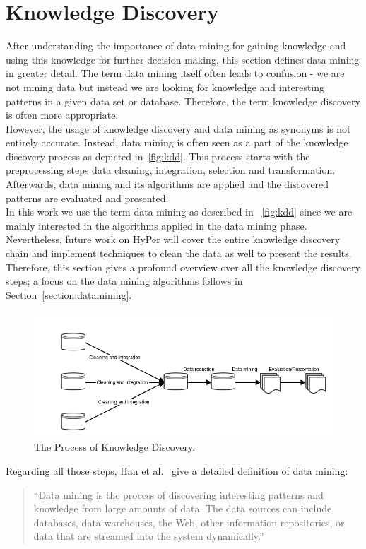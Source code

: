\section{Knowledge Discovery}

After understanding the importance of data mining for gaining knowledge and using this knowledge for further decision making, this section defines data mining in greater detail. The term data mining itself often leads to confusion - we are not mining data but instead we are looking for knowledge and interesting patterns in a given data set or database. Therefore, the term knowledge discovery is often more appropriate.
\\
However, the usage of knowledge discovery and data mining as synonyms is not entirely accurate. Instead, data mining is often seen as a part of the knowledge discovery process as depicted in~\autoref{fig:kdd}. This process starts with the preprocessing steps data cleaning, integration, selection and transformation. Afterwards, data mining and its algorithms are applied and the discovered patterns are evaluated and presented. 
\\
In this work we use the term data mining as described in ~\autoref{fig:kdd} since we are mainly interested in the algorithms applied in the data mining phase. Nevertheless, future work on HyPer will cover the entire knowledge discovery chain and implement techniques to clean the data as well to present the results. Therefore, this section gives a profound overview over all the knowledge discovery steps; a focus on the data mining algorithms follows in Section~\ref{section:datamining}.


\begin{figure}[htsb]
  \centering
  \includegraphics[scale=0.5]{figures/kdd}
  \caption[The Process of Knowledge Discovery]{The Process of Knowledge Discovery.}\label{fig:kdd}
\end{figure}


Regarding all those steps, Han et al.~\parencite[8]{dmbook} give a detailed definition of data mining: 
\begin{quote}
“Data mining is the process of discovering interesting patterns and knowledge from large amounts of data. The data sources can include databases, data warehouses, the Web, other information repositories, or data that are streamed into the system dynamically.”
\end{quote}

